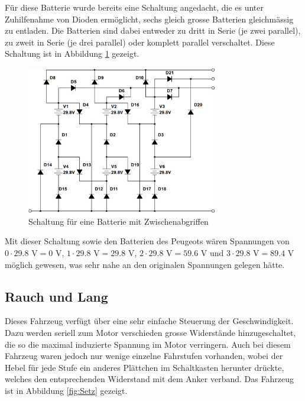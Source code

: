 Für diese Batterie wurde bereits eine Schaltung angedacht, die es unter Zuhilfenahme von Dioden ermöglicht, sechs gleich grosse Batterien gleichmässig zu entladen. Die Batterien sind dabei entweder zu dritt in Serie (je zwei parallel), zu zweit in Serie (je drei parallel) oder komplett parallel verschaltet. Diese Schaltung ist in Abbildung \ref{fig:68} gezeigt.

\begin{figure}[h!]
	\centering
		\includegraphics[width=0.75\textwidth]{images/68.PNG}
	\caption{Schaltung für eine Batterie mit Zwischenabgriffen}
	\label{fig:68}
\end{figure}

Mit dieser Schaltung sowie den Batterien des Peugeots wären Spannungen von $0\cdot29.8$ V$=0$ V, $1\cdot29.8$ V$=29.8$ V, $2\cdot29.8$ V$=59.6$ V und $3\cdot29.8$ V$=89.4$ V möglich gewesen, was sehr nahe an den originalen Spannungen gelegen hätte.

\subsection{Rauch und Lang}
Dieses Fahrzeug verfügt über eine sehr einfache Steuerung der Geschwindigkeit. Dazu werden seriell zum Motor verschieden grosse Widerstände hinzugeschaltet, die so die maximal induzierte Spannung im Motor verringern. Auch bei diesem Fahrzeug waren jedoch nur wenige einzelne Fahrstufen vorhanden, wobei der Hebel für jede Stufe ein anderes Plättchen im Schaltkasten herunter drückte, welches den entsprechenden Widerstand mit dem Anker verband. Das Fahrzeug ist in Abbildung \ref{fig:Setz} gezeigt.

